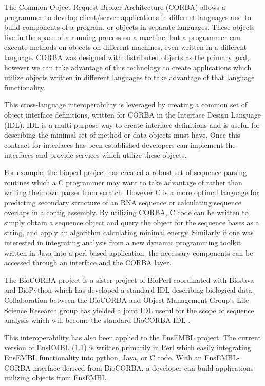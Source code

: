\documentclass{article}
\begin{document}
\begin{twocolumn}
The Common Object Request Broker Architecture (CORBA) allows a
programmer to develop client/server applications in different
languages and to build components of a program, or objects in separate
languages.  These objects live in the space of a running process on a
machine, but a programmer can execute methods on objects on different
machines, even written in a different language. CORBA was designed
with distributed objects as the primary goal, however we can take
advantage of this technology to create applications which utilize
objects written in different languages to take advantage of that
language functionality.

This cross-language interoperability is leveraged by creating a common
set of object interface definitions, written for CORBA in the
Interface Design Language (IDL).  IDL is a multi-purpose way to create
interface definitions and is useful for describing the minimal set of
method or data objects must have.  Once this contract for interfaces
has been established developers can implement the interfaces and
provide services which utilize these objects. 

For example, the bioperl project has created a robust set of sequence
parsing routines which a C programmer may want to take advantage of
rather than writing their own parser from scratch.  However C is a
more optimal language for predicting secondary structure of an RNA
sequence or calculating sequence overlaps in a contig assembly.  By
utilizing CORBA, C code can be written to simply obtain a sequence
object and query the object for the sequence bases as a string, and
apply an algorithm calculating minimal energy.  Similarly if one was
interested in integrating analysis from a new dynamic programming
toolkit written in Java into a perl based application, the necessary
components can be accessed through an interface and the CORBA layer.

The BioCORBA project is a sister project of BioPerl coordinated with
BioJava and BioPython which has developed a standard IDL describing
biological data.  Collaboration between the BioCORBA and Object
Management Group's Life Science Research group has yielded a joint IDL
useful for the scope of sequence analysis which will become the
standard BioCORBA IDL \cite{biocorba}.

This interoperability has also been applied to the EnsEMBL project.
The current version of EnsEMBL (1.1) is written primarily in Perl
which easily integrating EnsEMBL functionality into python, Java, or C
code.  With an EnsEMBL-CORBA interface derived from BioCORBA, a
developer can build applications utilizing objects from EnsEMBL.


\end{twocolumn}
\end{document}
